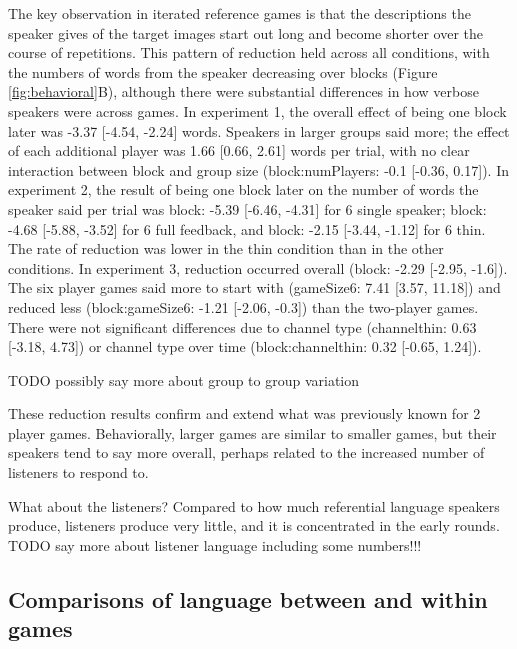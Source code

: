 \documentclass[
  english,
  a4paper,
]{article}
\begin{document}
The key observation in iterated reference games is that the descriptions the speaker gives of the target images start out long and become shorter over the course of repetitions. This pattern of reduction held across all conditions, with the numbers of words from the speaker decreasing over blocks (Figure \ref{fig:behavioral}B), although there were substantial differences in how verbose speakers were across games. In experiment 1, the overall effect of being one block later was -3.37 {[}-4.54, -2.24{]} words. Speakers in larger groups said more; the effect of each additional player was 1.66 {[}0.66, 2.61{]} words per trial, with no clear interaction between block and group size (block:numPlayers: -0.1 {[}-0.36, 0.17{]}). In experiment 2, the result of being one block later on the number of words the speaker said per trial was block: -5.39 {[}-6.46, -4.31{]} for 6 single speaker; block: -4.68 {[}-5.88, -3.52{]} for 6 full feedback, and block: -2.15 {[}-3.44, -1.12{]} for 6 thin. The rate of reduction was lower in the thin condition than in the other conditions. In experiment 3, reduction occurred overall (block: -2.29 {[}-2.95, -1.6{]}). The six player games said more to start with (gameSize6: 7.41 {[}3.57, 11.18{]}) and reduced less (block:gameSize6: -1.21 {[}-2.06, -0.3{]}) than the two-player games. There were not significant differences due to channel type (channelthin: 0.63 {[}-3.18, 4.73{]}) or channel type over time (block:channelthin: 0.32 {[}-0.65, 1.24{]}).

TODO possibly say more about group to group variation

These reduction results confirm and extend what was previously known for 2 player games. Behaviorally, larger games are similar to smaller games, but their speakers tend to say more overall, perhaps related to the increased number of listeners to respond to.

What about the listeners? Compared to how much referential language speakers produce, listeners produce very little, and it is concentrated in the early rounds. TODO say more about listener language including some numbers!!!

\hypertarget{comparisons-of-language-between-and-within-games}{%
\subsection{Comparisons of language between and within games}\label{comparisons-of-language-between-and-within-games}}
\end{document}
